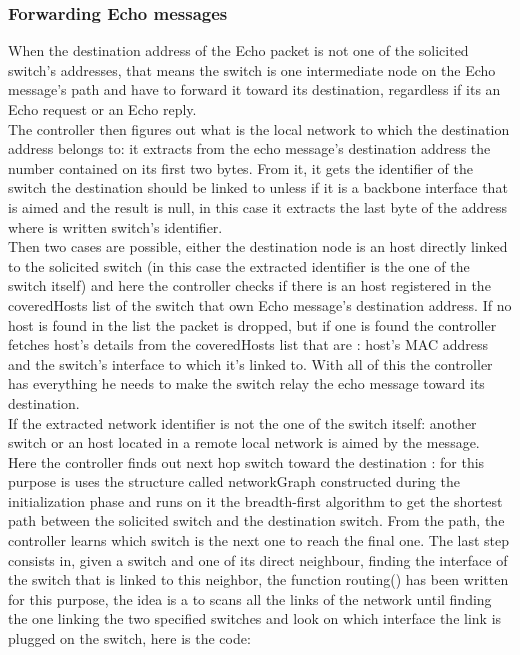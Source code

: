 \documentclass{article}
\begin{document}
\subsubsection{Forwarding Echo messages}

When the destination address of the Echo packet is not one of the
solicited switch's addresses, that means the switch is one intermediate
node on the Echo message's path and have to forward it toward its
destination, regardless if its an Echo request or an Echo reply.\\
\newline
The controller then figures out what is the local network to which the
destination address belongs to: it extracts from the echo message's
destination address the number contained on its first two bytes. From
it, it gets the identifier of the switch the destination should be
linked to unless if it is a backbone interface that is aimed and the
result is null, in this case it extracts the last byte of the address
where is written switch's identifier.\\
\newline
Then two cases are possible, either the destination node is an host
directly linked to the solicited switch (in this case the extracted
identifier is the one of the switch itself) and here the controller
checks if there is an host registered in the coveredHosts list of the
switch that own Echo message's destination address. If no host is
found in the list the packet is dropped, but if one is found the
controller fetches host's details from the coveredHosts list that are
: host's MAC address and the switch's interface to which it's linked
to. With all of this the controller has everything he needs to make
the switch relay the echo message toward its destination.\\
\newline
If the extracted network identifier is not the one of the switch
itself: another switch or an host located in a remote local network is
aimed by the message. Here the controller finds out next hop switch
toward the destination : for this purpose is uses the structure called
networkGraph constructed during the initialization phase and runs on
it the breadth-first algorithm to get the shortest path between the
solicited switch and the destination switch. From the path, the
controller learns which switch is the next one to reach the final
one. The last step consists in, given a switch and one of its direct
neighbour, finding the interface of the switch that is linked to this
neighbor, the function routing() has been written for this purpose,
the idea is a to scans all the links of the network until finding the
one linking the two specified switches and look on which interface the
link is plugged on the switch, here is the code:
\end{document}
